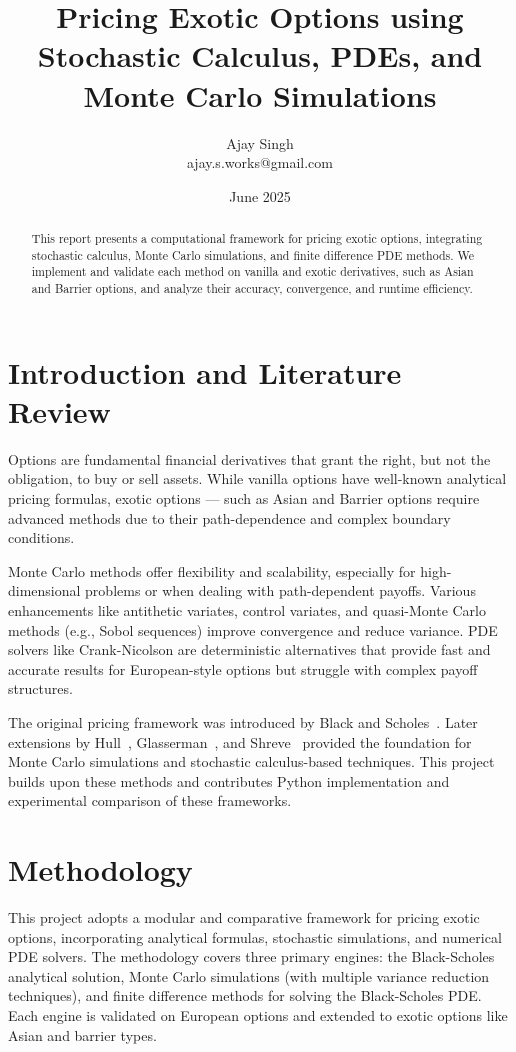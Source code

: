 \documentclass[12pt,a4paper]{article}
\title{Pricing Exotic Options using Stochastic Calculus, PDEs, and Monte Carlo Simulations}
\author{Ajay Singh \\ ajay.s.works@gmail.com}
\date{June 2025}
\begin{document}
\maketitle

\begin{abstract}
This report presents a computational framework for pricing exotic options, integrating stochastic calculus, Monte Carlo simulations, and finite difference PDE methods. We implement and validate each method on vanilla and exotic derivatives, such as Asian and Barrier options, and analyze their accuracy, convergence, and runtime efficiency.
\end{abstract}

\tableofcontents
\newpage

\section{Introduction and Literature Review}
Options are fundamental financial derivatives that grant the right, but not the obligation, to buy or sell assets. While vanilla options have well-known analytical pricing formulas, exotic options — such as Asian and Barrier options require advanced methods due to their path-dependence and complex boundary conditions.

Monte Carlo methods offer flexibility and scalability, especially for high-dimensional problems or when dealing with path-dependent payoffs. Various enhancements like antithetic variates, control variates, and quasi-Monte Carlo methods (e.g., Sobol sequences) improve convergence and reduce variance. PDE solvers like Crank-Nicolson are deterministic alternatives that provide fast and accurate results for European-style options but struggle with complex payoff structures.

The original pricing framework was introduced by Black and Scholes~\cite{black1973pricing}. Later extensions by Hull~\cite{hull2018options}, Glasserman~\cite{glasserman2004monte}, and Shreve~\cite{shreve2004stochastic} provided the foundation for Monte Carlo simulations and stochastic calculus-based techniques. This project builds upon these methods and contributes Python implementation and experimental comparison of these frameworks.

\section{Methodology}

This project adopts a modular and comparative framework for pricing exotic options, incorporating analytical formulas, stochastic simulations, and numerical PDE solvers. The methodology covers three primary engines: the Black-Scholes analytical solution, Monte Carlo simulations (with multiple variance reduction techniques), and finite difference methods for solving the Black-Scholes PDE. Each engine is validated on European options and extended to exotic options like Asian and barrier types.
\end{document}
